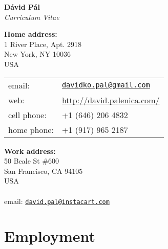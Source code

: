 \documentclass[9pt]{article}
\begin{document}
\begin{center}
{\huge \textbf{D\'avid P\'al}} \\[0.2cm]
\emph{Curriculum Vitae}
\end{center}

\vspace{0.2cm}

%
\noindent
\begin{minipage}[t]{10cm}
\textbf{Home address:} \\
1 River Place, Apt. 2918 \\
New York, NY 10036 \\
USA \\

\begin{tabular}{@{}ll}
email:       & \href{mailto:davidko.pal@gmail.com}{\texttt{davidko.pal@gmail.com}} \\
web:         & \url{http://david.palenica.com/} \\
cell phone:  & +1 (646) 206 4832 \\
home phone:  & +1 (917) 965 2187 \\
\end{tabular}
\end{minipage}
%
\begin{minipage}[t]{10cm}
\textbf{Work address:} \\
50 Beale St \#600 \\
San Francisco, CA 94105 \\
USA \\
\\
email: \href{mailto:david.pal@instacart.com}{\texttt{david.pal@instacart.com}} \\
\end{minipage}

\section*{Employment}
\end{document}
